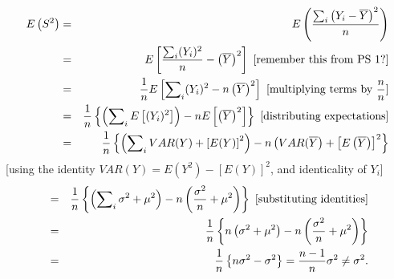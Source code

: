 \documentclass[11pt]{article}
\begin{document}
\begin{center}
\begin{eqnarray*}
E\left( S^{2}\right) &=&E\left( \frac{\sum\nolimits_{i}\left( Y_{i}-%
\overline{Y}\right) ^{2}}{n}\right) \\
&=&E\left[ \frac{\sum\nolimits_{i}(Y_{i})^{2}}{n}-\left( \overline{Y}\right)
^{2}\right] \text{ [remember this from PS 1?]} \\
&=&\frac{1}{n}E\left[ \sum\nolimits_{i}(Y_{i})^{2}-n\left( \overline{Y}%
\right) ^{2}\right] \text{ [multiplying terms by }\frac{n}{n}\text{]} \\
&=&\frac{1}{n}\left\{ \left( \sum\nolimits_{i}E\left[ (Y_{i})^{2}\right]
\right) -nE\left[ \left( \overline{Y}\right) ^{2}\right] \right\} \text{\
[distributing expectations]} \\
&=&\frac{1}{n}\left\{ \left( \sum\nolimits_{i}VAR(Y)+\left[ E(Y)\right]
^{2}\right) -n\left( VAR(\overline{Y}\right) +\left[ E\left( \overline{Y}%
\right) \right] ^{2}\right\}
\end{eqnarray*}%
[using the identity $VAR(Y)=E(Y^{2})-\left[ E(Y)\right] ^{2}$, and
identicality of $Y_{i}$]%
\begin{eqnarray*}
&=&\frac{1}{n}\left\{ \left( \sum\nolimits_{i}\sigma ^{2}+\mu ^{2}\right)
-n\left( \frac{\sigma ^{2}}{n}+\mu ^{2}\right) \right\} \text{ [substituting
identities]} \\
&=&\frac{1}{n}\left\{ n\left( \sigma ^{2}+\mu ^{2}\right) -n\left( \frac{%
\sigma ^{2}}{n}+\mu ^{2}\right) \right\} \\
&=&\frac{1}{n}\left\{ n\sigma ^{2}-\sigma ^{2}\right\} =\frac{n-1}{n}\sigma
^{2}\neq \sigma ^{2}.
\end{eqnarray*}
\end{center}
\end{document}
